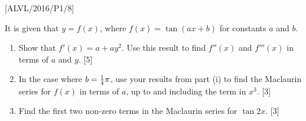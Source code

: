 \item {[}ALVL/2016/P1/8{]}

It is given that $y=f\left(x\right)$, where $f\left(x\right)=\tan\left(ax+b\right)$
for constants $a$ and $b$. 
\begin{enumerate}
\item Show that $f'(x)=a+ay^{2}$. Use this result to find $f''\left(x\right)$
and $f'''\left(x\right)$ in terms of $a$ and $y$. \hfill{}{[}5{]}
\item In the case where $b=\text{\ensuremath{\frac{1}{4}\pi}}$, use your
results from part (i) to find the Maclaurin series for $f\left(x\right)$
in terms of $a$, up to and including the term in $x^{3}$. \hfill{}{[}3{]}
\item Find the first two non-zero terms in the Maclaurin series for $\tan2x$.
\hfill{}{[}3{]}
\end{enumerate}
